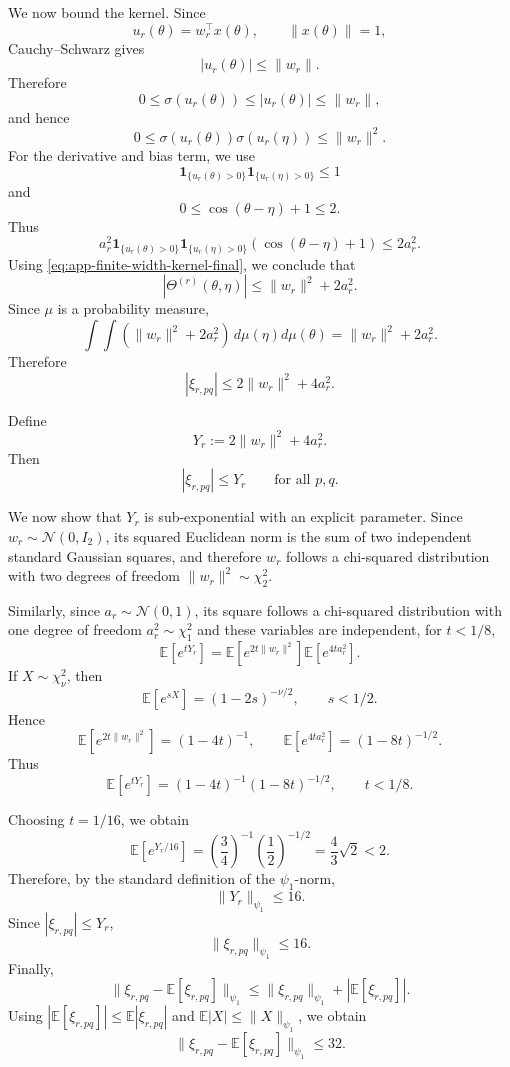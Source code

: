 We now bound the kernel. Since
\[
	u_r(\theta)=w_r^\top x(\theta),
	\qquad
	\|x(\theta)\|=1,
\]
Cauchy--Schwarz gives
\[
	|u_r(\theta)|\le \|w_r\|.
\]
Therefore
\[
	0\le \sigma(u_r(\theta))\le |u_r(\theta)|\le \|w_r\|,
\]
and hence
\[
	0\le \sigma(u_r(\theta))\sigma(u_r(\eta))\le \|w_r\|^2.
\]
For the derivative and bias term, we use
\[
	\mathbf 1_{\{u_r(\theta)>0\}}\mathbf 1_{\{u_r(\eta)>0\}}\le 1
\]
and
\[
	0\le \cos(\theta-\eta)+1\le 2.
\]
Thus
\[
	a_r^2
	\mathbf 1_{\{u_r(\theta)>0\}}
	\mathbf 1_{\{u_r(\eta)>0\}}
	(\cos(\theta-\eta)+1)
	\le
	2a_r^2.
\]
Using \eqref{eq:app-finite-width-kernel-final}, we conclude that
\[
	|\Theta^{(r)}(\theta,\eta)|
	\le
	\|w_r\|^2+2a_r^2.
\]
Since \(\mu\) is a probability measure,
\[
	\int\!\!\int
	(\|w_r\|^2+2a_r^2)\,d\mu(\eta)d\mu(\theta)
	=
	\|w_r\|^2+2a_r^2.
\]
Therefore
\begin{equation}
	|\xi_{r,pq}|
	\le
	2\|w_r\|^2+4a_r^2.
	\label{eq:app-finite-width-xi-bound}
\end{equation}

Define
\[
	Y_r:=2\|w_r\|^2+4a_r^2.
\]
Then
\[
	|\xi_{r,pq}|\le Y_r
	\qquad\text{for all }p,q.
\]

We now show that \(Y_r\) is sub-exponential with an explicit parameter. Since
\(w_r\sim \mathcal N(0,I_2)\), its squared Euclidean norm is the sum of two independent
standard Gaussian squares, and therefore \(w_r\) follows a chi-squared distribution
with two degrees of freedom \(\|w_r\|^2\sim \chi^2_2\).

Similarly, since \(a_r\sim \mathcal N(0,1)\), its square follows a chi-squared distribution
with one degree of freedom \(a_r^2\sim \chi^2_1\) and these variables are independent, for \(t<1/8\),
\[
	\mathbb E[e^{tY_r}]
	=
	\mathbb E[e^{2t\|w_r\|^2}]
	\mathbb E[e^{4ta_r^2}].
\]
If \(X\sim\chi^2_\nu\), then
\[
	\mathbb E[e^{sX}]=(1-2s)^{-\nu/2},
	\qquad s<1/2.
\]
Hence
\[
	\mathbb E[e^{2t\|w_r\|^2}]=(1-4t)^{-1},
	\qquad
	\mathbb E[e^{4ta_r^2}]=(1-8t)^{-1/2}.
\]
Thus
\begin{equation}
	\mathbb E[e^{tY_r}]
	=
	(1-4t)^{-1}(1-8t)^{-1/2},
	\qquad t<1/8.
	\label{eq:app-finite-width-Y-mgf}
\end{equation}

Choosing \(t=1/16\), we obtain
\[
	\mathbb E[e^{Y_r/16}]
	=
	\left(\frac34\right)^{-1}
	\left(\frac12\right)^{-1/2}
	=
	\frac43\sqrt2
	<2.
\]
Therefore, by the standard definition of the \(\psi_1\)-norm,
\begin{equation}
	\|Y_r\|_{\psi_1}\le 16.
	\label{eq:app-finite-width-Y-psi1}
\end{equation}
Since \(|\xi_{r,pq}|\le Y_r\),
\[
	\|\xi_{r,pq}\|_{\psi_1}\le 16.
\]
Finally,
\[
	\|\xi_{r,pq}-\mathbb E[\xi_{r,pq}]\|_{\psi_1}
	\le
	\|\xi_{r,pq}\|_{\psi_1}+|\mathbb E[\xi_{r,pq}]|.
\]
Using \(|\mathbb E[\xi_{r,pq}]|\le \mathbb E|\xi_{r,pq}|\) and
\(\mathbb E|X|\le \|X\|_{\psi_1}\), we obtain
\begin{equation}
	\|\xi_{r,pq}-\mathbb E[\xi_{r,pq}]\|_{\psi_1}\le 32.
	\label{eq:app-finite-width-centered-psi1}
\end{equation}

